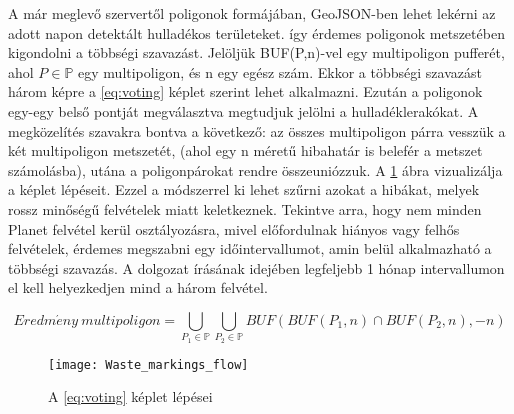 A már meglevő szervertől poligonok formájában, GeoJSON-ben \cite{rfc7946} lehet lekérni az adott napon detektált hulladékos területeket. így érdemes poligonok metszetében kigondolni a többségi szavazást. Jelöljük BUF(P,n)-vel egy multipoligon pufferét, ahol $P \in \mathbb{P}$ egy multipoligon, és n egy egész szám. Ekkor a többségi szavazást három képre a \ref{eq:voting}  képlet szerint lehet alkalmazni. Ezután a poligonok egy-egy belső pontját megválasztva megtudjuk jelölni a hulladéklerakókat. A megközelítés szavakra bontva a következő: az összes multipoligon párra vesszük a két multipoligon metszetét, (ahol egy n méretű hibahatár is belefér a metszet számolásba), utána a poligonpárokat rendre összeuniózzuk. A \ref{fig:union-intersection} ábra vizualizálja a képlet lépéseit. Ezzel a módszerrel ki lehet szűrni azokat a hibákat, melyek rossz minőségű felvételek miatt keletkeznek. Tekintve arra, hogy nem minden Planet felvétel kerül osztályozásra, mivel előfordulnak hiányos vagy felhős felvételek, érdemes megszabni egy időintervallumot, amin belül alkalmazható a többségi szavazás. A dolgozat írásának idejében legfeljebb 1 hónap intervallumon el kell helyezkedjen mind a három felvétel.

\begin{equation}\label{eq:voting}
    Eredm\acute{e}ny \ multipoligon = \bigcup_{P_1 \in \mathbb{P}} \bigcup_{P_2 \in \mathbb{P}} BUF(BUF(P_1,n) \cap BUF(P_2,n),-n)
\end{equation}

\begin{figure}[H]
	\centering
	\texttt{[image: Waste\_markings\_flow]}
	\caption{A \ref{eq:voting} képlet lépései}
    \label{fig:union-intersection}
\end{figure}